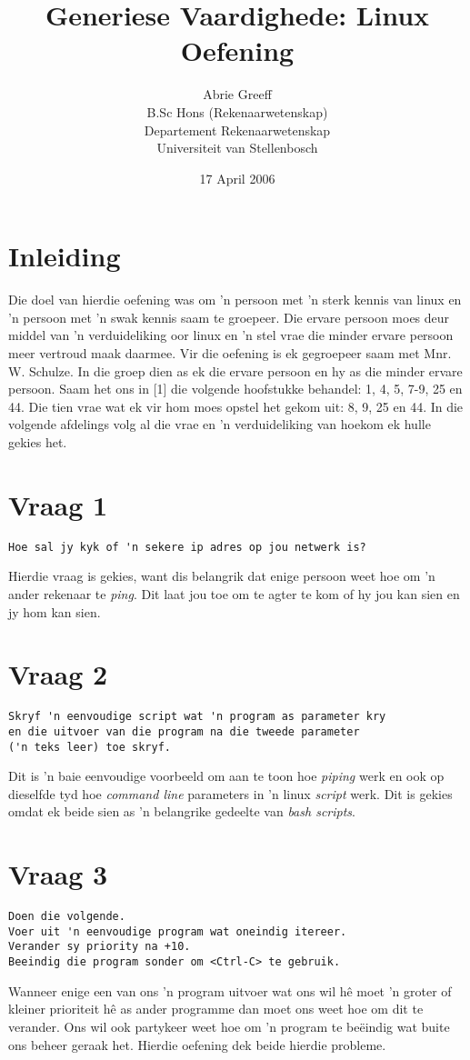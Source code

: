 \documentclass[a4paper,11pt,titlepage]{article}
\author{Abrie Greeff\\B.Sc Hons (Rekenaarwetenskap)\\Departement Rekenaarwetenskap\\Universiteit van Stellenbosch}
\date{17 April 2006}
\title{Generiese Vaardighede: Linux Oefening}
\begin{document}
\maketitle
\section{Inleiding}
Die doel van hierdie oefening was om 'n persoon met 'n sterk kennis van linux en 'n persoon met 'n swak kennis saam te groepeer. Die ervare persoon moes deur middel van 'n verduideliking oor linux en 'n stel vrae die minder ervare persoon meer vertroud maak daarmee. Vir die oefening is ek gegroepeer saam met Mnr. W. Schulze. In die groep dien as ek die ervare persoon en hy as die minder ervare persoon. Saam het ons in [1] die volgende hoofstukke behandel: 1, 4, 5, 7-9, 25 en 44. Die tien vrae wat ek vir hom moes opstel het gekom uit: 8, 9, 25 en 44. In die volgende afdelings volg al die vrae en 'n verduideliking van hoekom ek hulle gekies het.
\section{Vraag 1}
\begin{verbatim}
Hoe sal jy kyk of 'n sekere ip adres op jou netwerk is?
\end{verbatim}
Hierdie vraag is gekies, want dis belangrik dat enige persoon weet hoe om 'n ander rekenaar te \emph{ping}. Dit laat jou toe om te agter te kom of hy jou kan sien en jy hom kan sien.
\section{Vraag 2}
\begin{verbatim}
Skryf 'n eenvoudige script wat 'n program as parameter kry
en die uitvoer van die program na die tweede parameter
('n teks leer) toe skryf.
\end{verbatim}
Dit is 'n baie eenvoudige voorbeeld om aan te toon hoe \emph{piping} werk en ook op dieselfde tyd hoe \emph{command line} parameters in 'n linux \emph{script} werk. Dit is gekies omdat ek beide sien as 'n belangrike gedeelte van \emph{bash scripts}.
\section{Vraag 3}
\begin{verbatim}
Doen die volgende.
Voer uit 'n eenvoudige program wat oneindig itereer.
Verander sy priority na +10.
Beeindig die program sonder om <Ctrl-C> te gebruik.
\end{verbatim}
Wanneer enige een van ons 'n program uitvoer wat ons wil h\^e moet 'n groter of kleiner prioriteit h\^e as ander programme dan moet ons weet hoe om dit te verander. 
Ons wil ook partykeer weet hoe om 'n program te be\"eindig wat buite ons beheer geraak het. Hierdie oefening dek beide hierdie probleme.
\end{document}
